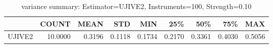 \begin{table}[ht]
\centering
\caption{variance summary: Estimator=UJIVE2, Instruments=100, Strength=0.10}
\begin{tabular}{lrrrrrrrr}
\toprule
 & COUNT & MEAN & STD & MIN & 25\% & 50\% & 75\% & MAX \\
\midrule
UJIVE2 & 10.0000 & 0.3196 & 0.1118 & 0.1734 & 0.2170 & 0.3361 & 0.4030 & 0.5056 \\
\bottomrule
\end{tabular}
\end{table}
